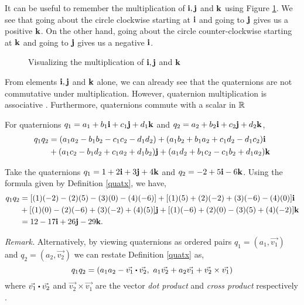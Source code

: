 It can be useful to remember the multiplication of $\textbf{i}, \textbf{j}$ and $\textbf{k}$ using Figure \ref{fig:quatxvis}. We see that going about the circle clockwise starting at $\textbf{i}$ and going to $\textbf{j}$ gives us a positive $\textbf{k}$. On the other hand, going about the circle counter-clockwise starting at $\textbf{k}$ and going to $\textbf{j}$ gives us a negative $\textbf{i}$.

\begin{figure}[H]
	\centering
	\caption{Visualizing the multiplication of $\textbf{i}, \textbf{j}$ and $\textbf{k}$}
	\label{fig:quatxvis}
\end{figure}

From elements $\textbf{i},\textbf{j}$ and $\textbf{k}$ alone, we can already see that the quaternions are not commutative under multiplication. However, quaternion multiplication is associative \cite{lerios}. Furthermore, quaternions commute with a scalar in $\operatorname{\mathbb{R}}$ \cite{lerios}

\begin{definition} \label{quatx}
	\emph{\cite{lerios}} For quaternions $q_1 = a_1 + b_1\textbf{i} + c_1\textbf{j} + d_1\textbf{k}$ and $q_2 = a_2 + b_2\textbf{i} + c_2\textbf{j} + d_2\textbf{k}$, 
	\begin{align*}
		q_1q_2 &= (a_1a_2 - b_1b_2 - c_1c_2 - d_1d_2) + (a_1b_2 + b_1a_2 + c_1d_2 - d_1c_2)\textbf{i} \\
			   &+ (a_1c_2 - b_1d_2 + c_1a_2 + d_1b_2)\textbf{j} + (a_1d_2 + b_1c_2 - c_1b_2 + d_1a_2)\textbf{k}
	\end{align*}
\end{definition}

\begin{ex} \label{ex:quatx}
	Take the quaternions $q_1 = 1+2\textbf{i}+3\textbf{j}+4\textbf{k}$ and $q_2 = -2+5\textbf{i}-6\textbf{k}$. Using the formula given by Definition \ref{quatx}, we have,
	\begin{align*}
		q_1 q_2 &= [(1)(-2)-(2)(5)-(3)(0)-(4)(-6)] + [(1)(5)+(2)(-2)+(3)(-6)-(4)(0)]\textbf{i} \\
		&+[(1)(0)-(2)(-6)+(3)(-2)+(4)(5)]\textbf{j} + [(1)(-6)+(2)(0)-(3)(5)+(4)(-2)]\textbf{k} \\
		&= 12 - 17\textbf{i} + 26\textbf{j} - 29\textbf{k}.
	\end{align*}
\end{ex}

\textit{Remark.} Alternatively, by viewing quaternions as ordered pairs $q_1 = (a_1,\vec{v_1})$ and $q_2 = (a_2,\vec{v_2})$ we can restate Definition \ref{quatx} as,
\begin{equation} \label{eq:qvectx}
	q_1 q_2 = (a_1a_2 - \vec{v_1}\bigcdot\vec{v_2},\text{ } a_1\vec{v_2}+a_2\vec{v_1}+\vec{v_2}\times\vec{v_1})
\end{equation}
where $\vec{v_1}\bigcdot\vec{v_2}$ and $\vec{v_2}\times\vec{v_1}$ are the vector \emph{dot product} and \emph{cross product} respectively \cite{lerios} \cite{mathoma}.

